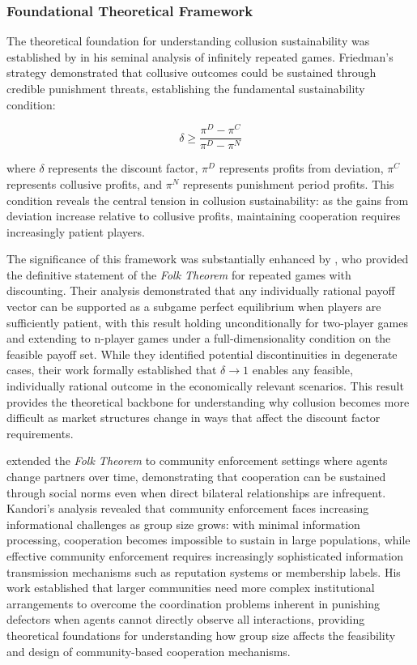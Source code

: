 \subsubsection*{Foundational Theoretical Framework}

The theoretical foundation for understanding collusion sustainability was established by \textcite{friedman_non-cooperative_1971} in his seminal analysis of infinitely repeated games. Friedman's  strategy demonstrated that collusive outcomes could be sustained through credible punishment threats, establishing the fundamental sustainability condition:

\begin{equation}
    \delta \geq \frac{\pi^{D} - \pi^{C}}{\pi^{D} - \pi^{N}}
\end{equation}

where $\delta$ represents the discount factor, $\pi^{D}$ represents profits from deviation, $\pi^{C}$ represents collusive profits, and $\pi^{N}$ represents punishment period profits. This condition reveals the central tension in collusion sustainability: as the gains from deviation increase relative to collusive profits, maintaining cooperation requires increasingly patient players.

The significance of this framework was substantially enhanced by \textcite{fudenberg_folk_1986}, who provided the definitive statement of the \emph{Folk Theorem} for repeated games with discounting. Their analysis demonstrated that any individually rational payoff vector can be supported as a subgame perfect equilibrium when players are sufficiently patient, with this result holding unconditionally for two-player games and extending to n-player games under a full-dimensionality condition on the feasible payoff set. While they identified potential discontinuities in degenerate cases, their work formally established that $\delta \rightarrow 1$ enables any feasible, individually rational outcome in the economically relevant scenarios. This result provides the theoretical backbone for understanding why collusion becomes more difficult as market structures change in ways that affect the discount factor requirements.

\textcite{kandori_social_1992} extended the \emph{Folk Theorem} to community enforcement settings where agents change partners over time, demonstrating that cooperation can be sustained through social norms even when direct bilateral relationships are infrequent. Kandori's analysis revealed that community enforcement faces increasing informational challenges as group size grows: with minimal information processing, cooperation becomes impossible to sustain in large populations, while effective community enforcement requires increasingly sophisticated information transmission mechanisms such as reputation systems or membership labels. His work established that larger communities need more complex institutional arrangements to overcome the coordination problems inherent in punishing defectors when agents cannot directly observe all interactions, providing theoretical foundations for understanding how group size affects the feasibility and design of community-based cooperation mechanisms.

